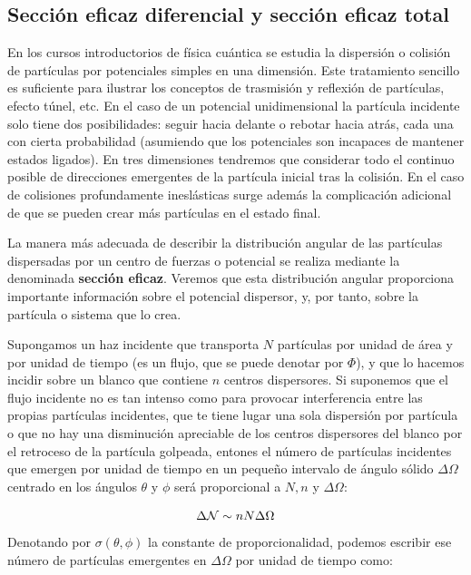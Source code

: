 \subsection{Sección eficaz diferencial y sección eficaz total}

En los cursos introductorios de física cuántica se estudia la dispersión o colisión de partículas por potenciales simples en una dimensión. Este tratamiento sencillo es suficiente para ilustrar los conceptos de trasmisión y reflexión de partículas, efecto túnel, etc. En el caso de un potencial unidimensional la partícula incidente solo tiene dos posibilidades: seguir hacia delante o rebotar hacia atrás, cada una con cierta probabilidad (asumiendo que los potenciales son incapaces de mantener estados ligados). En tres dimensiones tendremos que considerar todo el continuo posible de direcciones emergentes de la partícula inicial tras la colisión. En el caso de colisiones profundamente ineslásticas surge además la complicación adicional de que se pueden crear más partículas en el estado final.

La manera más adecuada de describir la distribución angular de las partículas dispersadas por un centro de fuerzas o potencial se realiza mediante la denominada \textbf{sección eficaz}. Veremos que esta distribución angular proporciona importante información sobre el potencial dispersor, y, por tanto, sobre la partícula o sistema que lo crea.

Supongamos un haz incidente que transporta $N$ partículas por unidad de área y por unidad de tiempo (es un flujo, que se puede denotar por $\Phi$), y que lo hacemos incidir sobre un blanco que contiene $n$ centros dispersores. Si suponemos que el flujo incidente no es tan intenso como para provocar interferencia entre las propias partículas incidentes, que te tiene lugar una sola dispersión por partícula o que no hay una disminución apreciable de los centros dispersores del blanco por el retroceso de la partícula golpeada, entones el número de partículas incidentes que emergen por unidad de tiempo en un pequeño intervalo de ángulo sólido $\Delta \Omega$ centrado en los ángulos $\theta$ y $\phi$ será proporcional a $N,n$ y $\Delta \Omega$:

\begin{equation}
	\Delta \mathcal{N} \sim n N \Delta \Omega
\end{equation}
Denotando por $\sigma (\theta, \phi)$ la constante de proporcionalidad, podemos escribir ese número de partículas emergentes en $\Delta \Omega$ por unidad de tiempo como:

